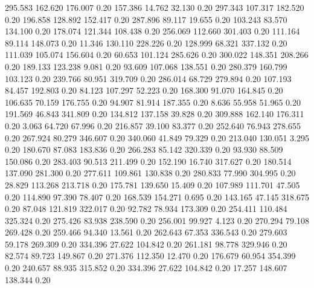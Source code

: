  295.583  162.620  176.007         0.20
 157.386   14.762   32.130         0.20
 297.343  107.317  182.520         0.20
 196.858  128.892  152.417         0.20
 287.896   89.117   19.655         0.20
 103.243   83.570  134.100         0.20
 178.074  121.344  108.438         0.20
 256.069  112.660  301.403         0.20
 111.164   89.114  148.073         0.20
  11.346  130.110  228.226         0.20
 128.999   68.321  337.132         0.20
 111.039  105.074  156.604         0.20
  60.653  101.124  285.626         0.20
 300.022  148.351  208.266         0.20
 189.133  123.238    9.081         0.20
  93.609  107.068  138.551         0.20
 280.379  160.799  103.123         0.20
 239.766   80.951  319.709         0.20
 286.014   68.729  279.894         0.20
 107.193   84.457  192.803         0.20
  84.123  107.297   52.223         0.20
 168.300   91.070  164.845         0.20
 106.635   70.159  176.755         0.20
  94.907   81.914  187.355         0.20
   8.636   55.958   51.965         0.20
 191.569   46.843  341.809         0.20
 134.812  137.158   39.828         0.20
 309.888  162.140  176.311         0.20
   3.063   64.720   67.996         0.20
 216.857   39.100   83.377         0.20
 252.640   76.943  278.655         0.20
 267.924   80.279  346.607         0.20
 340.060   41.849   79.329         0.20
 213.040  130.051    3.295         0.20
 180.670   87.083  183.836         0.20
 266.283   85.142  320.339         0.20
  93.930   88.509  150.086         0.20
 283.403   90.513  211.499         0.20
 152.190   16.740  317.627         0.20
 180.514  137.090  281.300         0.20
 277.611  109.861  130.838         0.20
 280.833   77.990  304.995         0.20
  28.829  113.268  213.718         0.20
 175.781  139.650   15.409         0.20
 107.989  111.701   47.505         0.20
 114.890   97.390   78.407         0.20
 168.539  154.271    0.695         0.20
 143.165   47.145  318.675         0.20
  87.048  121.819  322.017         0.20
  92.782   78.934  173.309         0.20
 254.411  110.484  325.324         0.20
 275.426   83.938  238.590         0.20
 256.001   99.927    4.123         0.20
 270.294   79.108  269.428         0.20
 259.466   94.340   13.561         0.20
 262.643   67.353  336.543         0.20
 279.603   59.178  269.309         0.20
 334.396   27.622  104.842         0.20
 261.181   98.778  329.946         0.20
  82.574   89.723  149.867         0.20
 271.376  112.350   12.470         0.20
 176.679   60.954  354.399         0.20
 240.657   88.935  315.852         0.20
 334.396   27.622  104.842         0.20
  17.257  148.607  138.344         0.20
